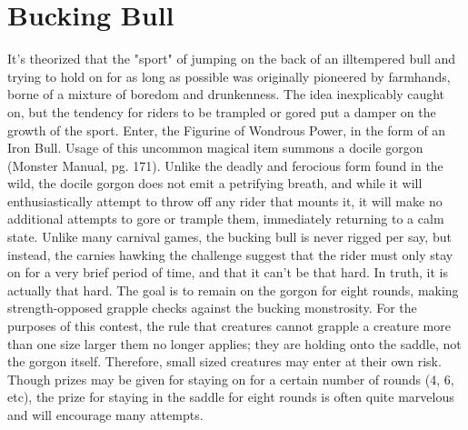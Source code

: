 \documentclass[10pt,a4paper,twoside,bg=print,twocolumn,openany,nodeprecatedcode]{dndbook}
\begin{document}
\section{Bucking Bull}
It's theorized that the "sport" of jumping on the back of an illtempered bull and trying to hold on for as long as possible was originally pioneered by farmhands, borne of a mixture of boredom and drunkenness. The idea inexplicably caught on, but the tendency for riders to be trampled or gored put a damper on the growth of the sport.
Enter, the Figurine of Wondrous Power, in the form of an Iron Bull. Usage of this uncommon magical item summons a docile gorgon (Monster Manual, pg. 171). Unlike the deadly and ferocious form found in the wild, the docile gorgon does not emit a petrifying breath, and while it will enthusiastically attempt to throw off any rider that mounts it, it will make no additional attempts to gore or trample them, immediately returning to a calm state.
Unlike many carnival games, the bucking bull is never rigged per say, but instead, the carnies hawking the challenge suggest that the rider must only stay on for a very brief period of time, and that it can't be that hard. In truth, it is actually that hard.
The goal is to remain on the gorgon for eight rounds, making strength-opposed grapple checks against the bucking monstrosity. For the purposes of this contest, the rule that creatures cannot grapple a creature more than one size larger them no longer applies; they are holding onto the saddle, not the gorgon itself. Therefore, small sized creatures may enter at their own risk.
Though prizes may be given for staying on for a certain number of rounds (4, 6, etc), the prize for staying in the saddle for eight rounds is often quite marvelous and will encourage many attempts.
\end{document}
